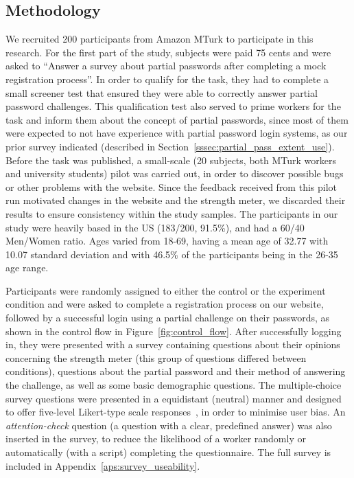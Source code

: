   \subsection{Methodology}
    \label{ssec:useability_setup}
    We recruited 200 participants from Amazon MTurk to participate in this research. For the first part of the study, subjects were paid 75 cents and were asked to ``Answer a survey about partial passwords after completing a mock registration process''. In order to qualify for the task, they had to complete a small screener test that ensured they were able to correctly answer partial password challenges. This qualification test also served to prime workers for the task and inform them about the concept of partial passwords, since most of them were expected to not have experience with partial password login systems, as our prior survey indicated (described in Section~\ref{sssec:partial_pass_extent_use}). Before the task was published, a small-scale (20 subjects, both MTurk workers and university students) pilot was carried out, in order to discover possible bugs or other problems with the website. Since the feedback received from this pilot run motivated changes in the website and the strength meter, we discarded their results to ensure consistency within the study samples. The participants in our study were heavily based in the US (183/200, 91.5\%), and had a 60/40 Men/Women ratio. Ages varied from 18-69, having a mean age of 32.77 with 10.07 standard deviation and with 46.5\% of the participants being in the 26-35 age range.

    Participants were randomly assigned to either the control or the experiment condition and were asked to complete a registration process on our website, followed by a successful login using a partial challenge on their passwords, as shown in the control flow in Figure~\ref{fig:control_flow}. After successfully logging in, they were presented with a survey containing questions about their opinions concerning the strength meter (this group of questions differed between conditions), questions about the partial password and their method of answering the challenge, as well as some basic demographic questions. The multiple-choice survey questions were presented in a equidistant (neutral) manner and designed to offer five-level Likert-type scale responses~\cite{likert}, in order to minimise user bias. An \emph{attention-check} question (a question with a clear, predefined answer) was also inserted in the survey, to reduce the likelihood of a worker randomly or automatically (with a script) completing the questionnaire. The full survey is included in Appendix~\ref{aps:survey_useability}.

